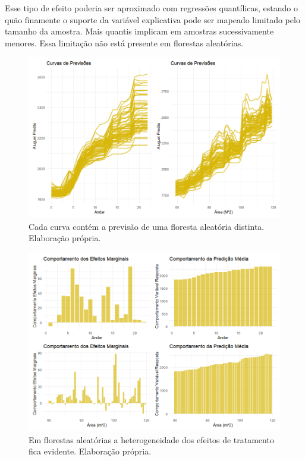 Esse tipo de efeito poderia ser aproximado com regressões quantílicas, estando o quão finamente o suporte da variável explicativa pode ser mapeado limitado pelo tamanho da amostra. Mais quantis implicam em amostras sucessivamente menores. Essa limitação não está presente em florestas aleatórias. 

\begin{figure}[H]
    \centering
    \includegraphics[scale = .60]{imagens/curvas_previsoes_rf.png}
    \caption{Cada curva contém a previsão de uma floresta aleatória distinta. Elaboração própria.}
\end{figure}



\begin{figure}[H]
    \centering
    \includegraphics[scale = .60]{imagens/efeitos_marginais_RF.png}
    \caption{Em florestas aleatórias a heterogeneidade dos efeitos de tratamento fica evidente. Elaboração própria.}
\end{figure}



